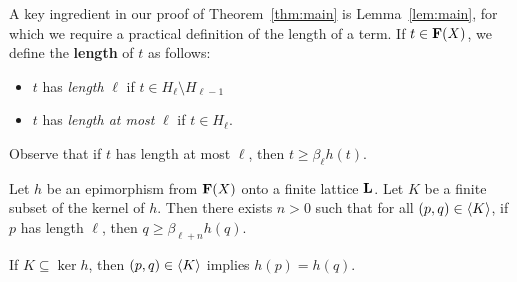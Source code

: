 A key ingredient in our proof of Theorem~\ref{thm:main} is Lemma~\ref{lem:main},
for which we require a practical definition of the length of a term.
If $t \in \mathbf{F}(X)$, we define 
the {\bf length} of $t$ as follows:
\begin{itemize}
\item $t$ has \emph{length} $\ell$ if $t \in H_\ell \setminus H_{\ell-1}$
\item $t$ has \emph{length at most} $\ell$ if $t \in H_\ell$.
\end{itemize} 
Observe that if $t$ has length at most $\ell$, then $t\geq \beta_\ell h (t)$.


\begin{lemma}\label{lem:main}
Let $h$ be an epimorphism from $\mathbf{F}(X)$ onto a finite lattice $\mathbf{L}$.
Let $K$ be a finite subset of the kernel of $h$.
Then there exists $n>0$ such that for all $(p,q) \in \langle K\rangle$, if $p$ has length 
$\ell$, then $q \geq \beta_{\ell+n}h(q)$.
\end{lemma}

\begin{remark}
If $K \subseteq \ker h$, then $(p,q) \in \langle K\rangle$ implies $h(p) = h(q)$. 
\end{remark}
  
